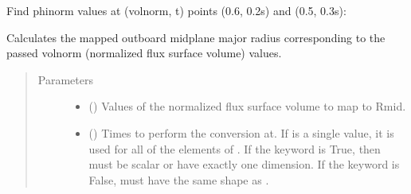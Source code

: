 \documentclass[letterpaper,10pt,english]{sphinxmanual}
\begin{document}
\begin{fulllineitems}
\begin{fulllineitems}
Find phinorm values at (volnorm, t) points (0.6, 0.2s) and (0.5, 0.3s):

\begin{sphinxVerbatim}[commandchars=\\\{\}]
  \PYG{p}{[} \PYG{p}{]} \PYG{p}{[} \PYG{p}{]} 
\end{sphinxVerbatim}

\end{fulllineitems}


\begin{fulllineitems}
\label{\detokenize{eqtools:eqtools.core.Equilibrium.volnorm2rmid}}
Calculates the mapped outboard midplane major radius corresponding to the passed volnorm (normalized flux surface volume) values.
\begin{quote}\begin{description}
\item[{Parameters}] \leavevmode\begin{itemize}
\item {} 
 () \textendash{} Values of the normalized
flux surface volume to map to Rmid.

\item {} 
 () \textendash{} Times to perform the conversion at.
If  is a single value, it is used for all of the elements of
. If the  keyword is True, then  must be scalar
or have exactly one dimension. If the  keyword is False,
 must have the same shape as .


\end{itemize}
\end{description}
\end{quote}
\end{fulllineitems}
\end{fulllineitems}
\end{document}
